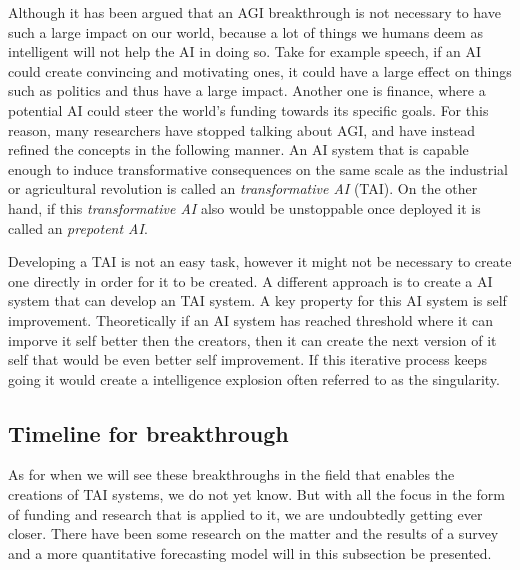 \documentclass[12pt,A4]{report}
\theoremstyle{definition}
\begin{document}
Although it has been argued that an AGI breakthrough is not necessary to have such a large impact on our world, because a lot of things we humans deem as intelligent will not help the AI in doing so. Take for example speech, if an AI could create convincing and motivating ones, it could have a large effect on things such as politics and thus have a large impact. Another one is finance, where a potential AI could steer the world's funding towards its specific goals. For this reason, many researchers have stopped talking about AGI, and have instead refined the concepts in the following manner. An AI system that is capable enough to induce transformative consequences on the same scale as the industrial or agricultural revolution is called an \textit{transformative AI} (TAI). On the other hand, if this \textit{transformative AI} also would be unstoppable once deployed it is called an \textit{prepotent AI}\autocite{Critch Kruger}. 

Developing a TAI is not an easy task, however it might not be necessary to create one directly in order for it to be created. A different approach is to create a AI system that can develop an TAI system. A key property for this AI system is self improvement. Theoretically if an AI system has reached threshold where it can imporve it self better then the creators, then it can create the next version of it self that would be even better self improvement. If this iterative process keeps going it would create a intelligence explosion often referred to as the singularity. \autocite{Superintelligence} 


\subsection{Timeline for breakthrough}
As for when we will see these breakthroughs in the field that enables the creations of TAI systems, we do not yet know. But with all the focus in the form of funding and research that is applied to it, we are undoubtedly getting ever closer. There have been some research on the matter and the results of a survey and a more quantitative forecasting model will in this subsection be presented. %
\end{document}

